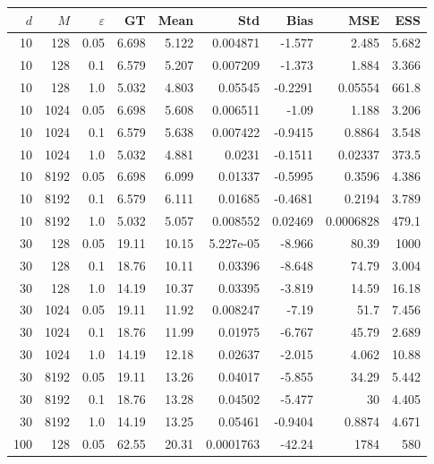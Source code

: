 \documentclass{article}
\begin{document}
\begin{table}[htbp]
\centering
\scriptsize
\setlength{\tabcolsep}{4pt}
\begin{tabular}{rrr|rrrrrr}
\toprule
$d$ & $M$ & $\varepsilon$ & GT & Mean & Std & Bias & MSE & ESS \\
\midrule
\rowcolor{yellow!40}10 & 128 & 0.05 & 6.698 & 5.122 & 0.004871 & -1.577 & 2.485 & 5.682 \\
\rowcolor{yellow!40}10 & 128 & 0.1 & 6.579 & 5.207 & 0.007209 & -1.373 & 1.884 & 3.366 \\
10 & 128 & 1.0 & 5.032 & 4.803 & 0.05545 & -0.2291 & 0.05554 & 661.8 \\
\midrule
\rowcolor{yellow!40}10 & 1024 & 0.05 & 6.698 & 5.608 & 0.006511 & -1.09 & 1.188 & 3.206 \\
\rowcolor{yellow!40}10 & 1024 & 0.1 & 6.579 & 5.638 & 0.007422 & -0.9415 & 0.8864 & 3.548 \\
10 & 1024 & 1.0 & 5.032 & 4.881 & 0.0231 & -0.1511 & 0.02337 & 373.5 \\
\midrule
10 & 8192 & 0.05 & 6.698 & 6.099 & 0.01337 & -0.5995 & 0.3596 & 4.386 \\
10 & 8192 & 0.1 & 6.579 & 6.111 & 0.01685 & -0.4681 & 0.2194 & 3.789 \\
10 & 8192 & 1.0 & 5.032 & 5.057 & 0.008552 & 0.02469 & 0.0006828 & 479.1 \\
\midrule
\rowcolor{orange!50}30 & 128 & 0.05 & 19.11 & 10.15 & 5.227e-05 & -8.966 & 80.39 & 1000 \\
\rowcolor{orange!50}30 & 128 & 0.1 & 18.76 & 10.11 & 0.03396 & -8.648 & 74.79 & 3.004 \\
\rowcolor{yellow!40}30 & 128 & 1.0 & 14.19 & 10.37 & 0.03395 & -3.819 & 14.59 & 16.18 \\
\midrule
\rowcolor{orange!50}30 & 1024 & 0.05 & 19.11 & 11.92 & 0.008247 & -7.19 & 51.7 & 7.456 \\
\rowcolor{orange!50}30 & 1024 & 0.1 & 18.76 & 11.99 & 0.01975 & -6.767 & 45.79 & 2.689 \\
\rowcolor{yellow!40}30 & 1024 & 1.0 & 14.19 & 12.18 & 0.02637 & -2.015 & 4.062 & 10.88 \\
\midrule
\rowcolor{orange!50}30 & 8192 & 0.05 & 19.11 & 13.26 & 0.04017 & -5.855 & 34.29 & 5.442 \\
\rowcolor{yellow!40}30 & 8192 & 0.1 & 18.76 & 13.28 & 0.04502 & -5.477 & 30 & 4.405 \\
30 & 8192 & 1.0 & 14.19 & 13.25 & 0.05461 & -0.9404 & 0.8874 & 4.671 \\
\midrule
\rowcolor{red!40}100 & 128 & 0.05 & 62.55 & 20.31 & 0.0001763 & -42.24 & 1784 & 580 \\

\end{tabular}
\end{table}
\end{document}
